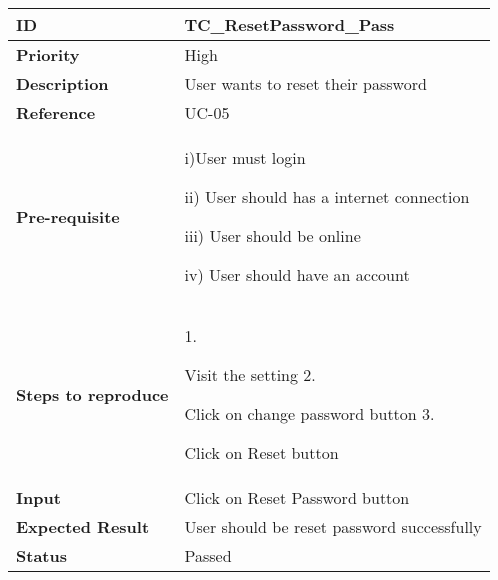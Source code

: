 \begin{center}
    \begin{tabularx}{\textwidth}{|l|X|}
        \hline
        \textbf{ID}                 & TC\_ResetPassword\_Pass                    \\
        \hline
        \textbf{Priority}           & High                                       \\
        \hline
        \textbf{Description}        & User wants to reset their password         \\
        \hline
        \textbf{Reference}          & UC-05                                      \\
        \hline
        \textbf{Pre-requisite}      & i)User must login

        ii) User should has a internet connection

        iii) User should be online

        iv) User should have an account                                          \\
        \hline
        \textbf{Steps to reproduce} & 1.

        Visit the setting 2.

        Click on change password button 3.

        Click on Reset button                                                    \\
        \hline
        \textbf{Input}              & Click on Reset Password button             \\
        \hline
        \textbf{Expected Result}    & User should be reset password successfully \\
        \hline
        \textbf{Status}             & Passed                                     \\
        \hline
    \end{tabularx}
\end{center}
\vspace{5mm}



